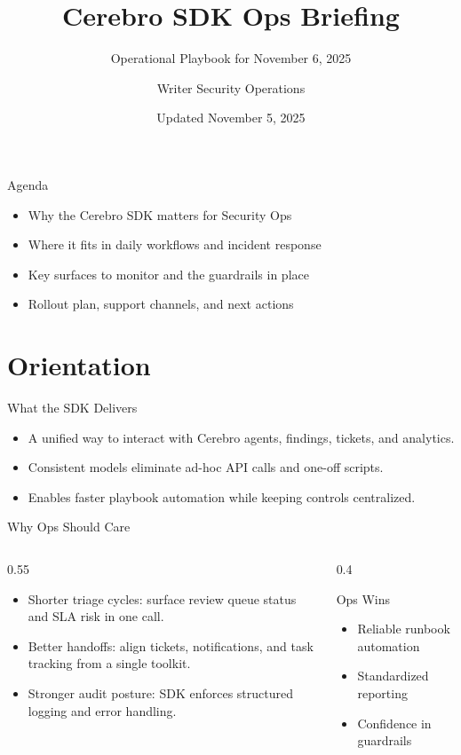 \documentclass[aspectratio=169]{beamer}
\title{Cerebro SDK Ops Briefing}
\subtitle{Operational Playbook for November 6, 2025}
\author{Writer Security Operations}
\date{Updated November 5, 2025}
\begin{document}
\begin{frame}
  \titlepage
\end{frame}

\begin{frame}{Agenda}
  \begin{itemize}
    \item Why the Cerebro SDK matters for Security Ops
    \item Where it fits in daily workflows and incident response
    \item Key surfaces to monitor and the guardrails in place
    \item Rollout plan, support channels, and next actions
  \end{itemize}
\end{frame}

\section{Orientation}

\begin{frame}{What the SDK Delivers}
  \begin{itemize}
    \item A unified way to interact with Cerebro agents, findings, tickets, and analytics.
    \item Consistent models eliminate ad-hoc API calls and one-off scripts.
    \item Enables faster playbook automation while keeping controls centralized.
  \end{itemize}
\end{frame}

\begin{frame}{Why Ops Should Care}
  \begin{columns}
    \begin{column}{0.55\textwidth}
      \begin{itemize}
        \item Shorter triage cycles: surface review queue status and SLA risk in one call.
        \item Better handoffs: align tickets, notifications, and task tracking from a single toolkit.
        \item Stronger audit posture: SDK enforces structured logging and error handling.
      \end{itemize}
    \end{column}
    \begin{column}{0.4\textwidth}
      \begin{block}{Ops Wins}
        \begin{itemize}
          \item Reliable runbook automation
          \item Standardized reporting
          \item Confidence in guardrails
        \end{itemize}
      \end{block}
    \end{column}
  \end{columns}
\end{frame}
\end{document}
